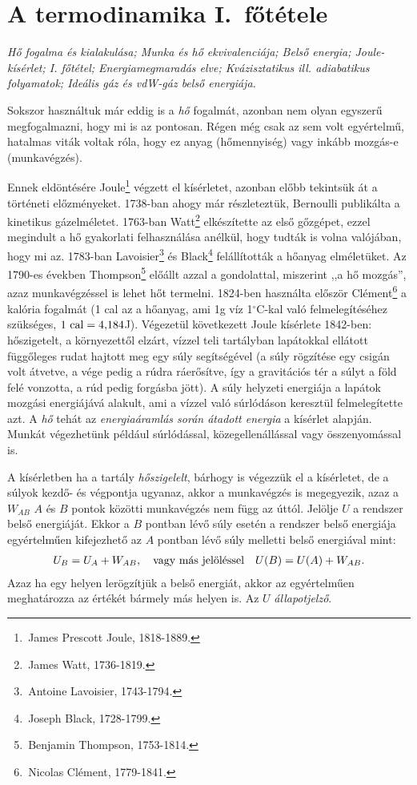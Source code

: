 \section{A termodinamika I.~főtétele}
\emph{Hő fogalma és kialakulása; Munka és hő ekvivalenciája; Belső energia; Joule-kísérlet; I. főtétel; Energiamegmaradás elve; Kvázisztatikus ill. adiabatikus folyamatok; Ideális gáz és vdW-gáz belső energiája.}

Sokszor használtuk már eddig is a \emph{hő} fogalmát, azonban nem olyan egyszerű megfogalmazni, hogy mi is az pontosan. Régen még csak az sem volt egyértelmű, hatalmas viták voltak róla, hogy ez anyag (hőmennyiség) vagy inkább mozgás-e (munkavégzés).

Ennek eldöntésére Joule\footnote{\,James Prescott Joule, 1818-1889.} végzett el kísérletet, azonban előbb tekintsük át a történeti előzményeket. 1738-ban ahogy már részleteztük, Bernoulli publikálta a kinetikus gázelméletet. 1763-ban Watt\footnote{\,James Watt, 1736-1819.} elkészítette az első gőzgépet, ezzel megindult a hő gyakorlati felhasználása anélkül, hogy tudták is volna valójában, hogy mi az. 1783-ban Lavoisier\footnote{\,Antoine Lavoisier, 1743-1794.} és Black\footnote{\,Joseph Black, 1728-1799.} felállították a hőanyag elméletüket. Az 1790-es években Thompson\footnote{\,Benjamin Thompson, 1753-1814.} előállt azzal a gondolattal, miszerint ,,a hő mozgás'', azaz munkavégzéssel is lehet hőt termelni. 1824-ben használta először Clément\footnote{\,Nicolas Clément, 1779-1841.} a kalória fogalmát (1 cal az a hőanyag, ami 1g víz 1$^\circ$C-kal való felmelegítéséhez szükséges, $1\textnormal{ cal} = 4{,}184$J). Végezetül következett Joule kísérlete 1842-ben: hőszigetelt, a környezettől elzárt, vízzel teli tartályban lapátokkal ellátott függőleges rudat hajtott meg egy súly segítségével (a súly rögzítése egy csigán volt átvetve, a vége pedig a rúdra ráerősítve, így a gravitációs tér a súlyt a föld felé vonzotta, a rúd pedig forgásba jött). A súly helyzeti energiája a lapátok mozgási energiájává alakult, ami a vízzel való súrlódáson keresztül felmelegítette azt. A \emph{hő} tehát az \emph{energiaáramlás során átadott energia} a kísérlet alapján. Munkát végezhetünk például súrlódással, közegellenállással vagy összenyomással is.

A kísérletben ha a tartály \emph{hőszigelelt}, bárhogy is végezzük el a kísérletet, de a súlyok kezdő- és végpontja ugyanaz, akkor a munkavégzés is megegyezik, azaz a $W_{AB}$ $A$ és $B$ pontok közötti munkavégzés nem függ az úttól. Jelölje $U$ a rendszer belső energiáját. Ekkor a $B$ pontban lévő súly esetén a rendszer belső energiája egyértelműen kifejezhető az $A$ pontban lévő súly melletti belső energiával mint:
\begin{align}
    U_B = U_A + W_{AB},\quad \textnormal{vagy más jelöléssel}\quad U(B) = U(A) + W_{AB}.
\end{align}
Azaz ha egy helyen lerögzítjük a belső energiát, akkor az egyértelműen meghatározza az értékét bármely más helyen is. Az $U$ \emph{állapotjelző}.

